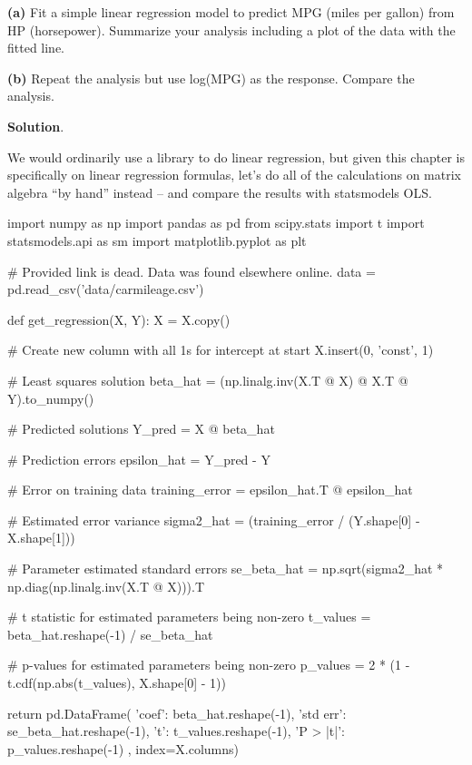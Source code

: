 \textbf{(a)} Fit a simple linear regression model to predict MPG (miles
per gallon) from HP (horsepower). Summarize your analysis including a
plot of the data with the fitted line.

\textbf{(b)} Repeat the analysis but use log(MPG) as the response.
Compare the analysis.

\textbf{Solution}.

We would ordinarily use a library to do linear regression, but given
this chapter is specifically on linear regression formulas, let's do all
of the calculations on matrix algebra ``by hand'' instead -- and compare
the results with statsmodels OLS.

\begin{python}
import numpy as np
import pandas as pd
from scipy.stats import t
import statsmodels.api as sm
import matplotlib.pyplot as plt

# Provided link is dead.  Data was found elsewhere online.
data = pd.read_csv('data/carmileage.csv')
\end{python}

\begin{python}
def get_regression(X, Y):
    X = X.copy()
    
    # Create new column with all 1s for intercept at start
    X.insert(0, 'const', 1)
    
    # Least squares solution
    beta_hat = (np.linalg.inv(X.T @ X) @ X.T @ Y).to_numpy()

    # Predicted solutions
    Y_pred = X @ beta_hat

    # Prediction errors
    epsilon_hat = Y_pred - Y

    # Error on training data
    training_error = epsilon_hat.T @ epsilon_hat
    
    # Estimated error variance
    sigma2_hat = (training_error / (Y.shape[0] - X.shape[1]))

    # Parameter estimated standard errors
    se_beta_hat = np.sqrt(sigma2_hat * np.diag(np.linalg.inv(X.T @ X))).T

    # t statistic for estimated parameters being non-zero
    t_values = beta_hat.reshape(-1) / se_beta_hat

    # p-values for estimated parameters being non-zero
    p_values = 2 * (1 - t.cdf(np.abs(t_values), X.shape[0] - 1))
    
    return pd.DataFrame({
        'coef': beta_hat.reshape(-1),
        'std err': se_beta_hat.reshape(-1),
        't': t_values.reshape(-1),
        'P > |t|': p_values.reshape(-1) 
        }, index=X.columns)
\end{python}


